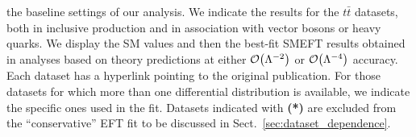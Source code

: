 \begin{table}[htbp]
{  the baseline settings of our analysis.
  We indicate the results for the $t\bar{t}$ datasets, both in inclusive
  production and in association with vector bosons or heavy quarks.
%
  We display the SM values and then the best-fit SMEFT results obtained
  in analyses based on theory predictions at either $\mathcal{O}\lp \Lambda^{-2}\rp$ or 
$\mathcal{O}\lp \Lambda^{-4}\rp$ accuracy.
%
Each dataset has a hyperlink pointing to the original publication.
%
For those datasets for which more than one differential distribution is available,
we indicate the specific
ones used in the fit.
%
    {Datasets indicated with {\bf (*)} are excluded from the ``conservative'' EFT
    fit to be discussed in Sect.~\ref{sec:dataset_dependence}.}
\label{eq:chi2-baseline}
}
\end{table}


